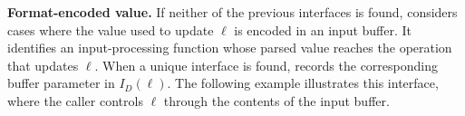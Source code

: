 







\vspace{3px}
\noindent\textbf{Format-encoded value.}
If neither of the previous interfaces is found, \sys considers cases where the value used to update $\ell$ is encoded in an input buffer. It identifies an input-processing function whose parsed value reaches the operation that updates $\ell$. When a unique interface is found, \sys records the corresponding buffer parameter in $I_D(\ell)$. The following example illustrates this interface, where the caller controls $\ell$ through the contents of the input buffer.




